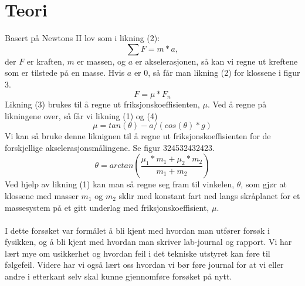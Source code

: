 \documentclass[10pt,a4paper]{report}
\begin{document}
\section*{Teori}
Basert på Newtons II lov som i likning (2): 
\begin{equation}
\sum{F} = m*a,
\end{equation} der $F$ er kraften, $m$ er massen, og $a$ er akselerasjonen, så kan vi regne ut kreftene som er tilstede på en masse. Hvis $a$ er 0, så får man likning (2) for klossene i figur 3. 
\begin{equation}
F = \mu *F_n
\end{equation}
Likning (3) brukes til å regne ut friksjonskoeffisienten, $\mu$. Ved å regne på likningene over, så får vi likning (1) og (4)
\begin{equation}
\mu = tan(\theta)-a/(cos(\theta)*g)
\end{equation}
Vi kan så bruke denne liknignen til å regne ut friksjonskoeffisienten for de forskjellige akselerasjonsmålingene. Se figur 324532432423. 
\begin{equation}
\theta = arctan(\frac{\mu_1*m_1+\mu_2*m_2}{m_1+m_2})
\end{equation}
Ved hjelp av likning (1) kan man så regne seg fram til vinkelen, $\theta$, som gjør at klossene med masser $m_1$ og $m_2$ sklir med konstant fart ned langs skråplanet for et massesystem på et gitt underlag med friksjonskoeffisient, $\mu$.\\
\\I dette forsøket var formålet å bli kjent med hvordan man utfører forsøk i fysikken, og å bli kjent med hvordan man skriver lab-journal og rapport. Vi har lært mye om usikkerhet og hvordan feil i det tekniske utstyret kan føre til følgefeil. Videre har vi også lært oss hvordan vi bør føre journal for at vi eller andre i etterkant selv skal kunne gjennomføre forsøket på nytt.
\end{document}
